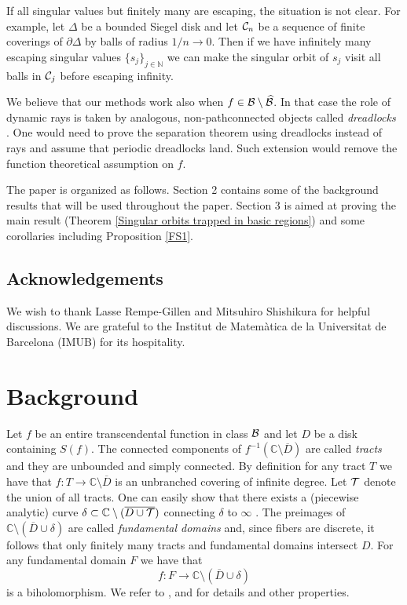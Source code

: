 \documentclass[11pt, twoside]{article}
\theoremstyle{definition}
\newcommand{\C}{\mathbb{C}}
\newcommand{\N}{\mathbb{N}}
\newcommand{\ov}{\overline}
\newcommand{\ra}{\rightarrow}
\newcommand{\BB}{{\cal B}}
\newcommand{\CC}{{\cal C}}
\newcommand{\TT}{{\cal T}}
\newcommand{\BBhat}{\widehat{\BB}}
\begin{document}
If all singular values {but finitely many}  are escaping, the situation is not clear. For example,  let $\Delta$ be a bounded Siegel disk and let $\CC_n$ be a sequence of finite  coverings of $\partial\Delta$ by balls of radius $1/n\ra0$. Then if we have infinitely many escaping singular values $\{s_j\}_{j\in\N}$ we can make the singular orbit of $s_j$ visit all balls in $\CC_j$ before escaping infinity.

  
We believe that our methods work also when $f\in\BB\setminus\BBhat$. In that case the role of dynamic rays is taken by analogous, non-pathconnected objects called \emph{dreadlocks} \cite{BRG17}. One would need to prove the separation theorem using dreadlocks instead of rays and assume that periodic dreadlocks land. Such extension would remove the function theoretical assumption on $f$.
 
 The paper is organized as follows. Section 2 contains some of the background results that will be used throughout the paper. Section 3 is aimed at proving the main result (Theorem \ref{Singular orbits trapped in basic regions}) and some corollaries including Proposition \ref{FS1}. %
 
 
\subsection*{Acknowledgements} We wish to thank Lasse Rempe-Gillen and Mitsuhiro Shishikura for helpful discussions. We are grateful to the Institut de Matem\`atica de la Universitat de Barcelona (IMUB) for its hospitality. 



\section{Background}\label{sect:Background}
Let $f$ be an entire transcendental function in class $\BB$ and let $D$ be a disk  containing $S(f)$.  The connected components of $f^{-1}(\C\setminus \ov{D})$ are called   \emph{tracts} and they are  unbounded and simply connected. By definition for any tract $T$ we have that $f:T\ra\C\setminus \ov{D}$ is an unbranched covering of infinite degree. Let $\TT$ denote the union of all tracts. 
One can easily show that there exists a (piecewise analytic) curve $\delta\subset \C\setminus(\ov{D\cup\TT})$ connecting $\delta$ to $\infty$ \cite{Rottenfusserthesis}. The preimages of $\C\setminus (\ov{D}\cup\delta)$ are called \emph{fundamental domains} and, since fibers are discrete, it follows that only finitely many tracts and fundamental domains intersect $D$.  For any fundamental domain $F$ we have that 
\[
f:F\ra \C\setminus (\ov{D}\cup\delta)
\]
 is a biholomorphism. We refer to \cite{EL92}, \cite{RRRS} and \cite{BF15} for details and other properties.  
 
\end{document}
